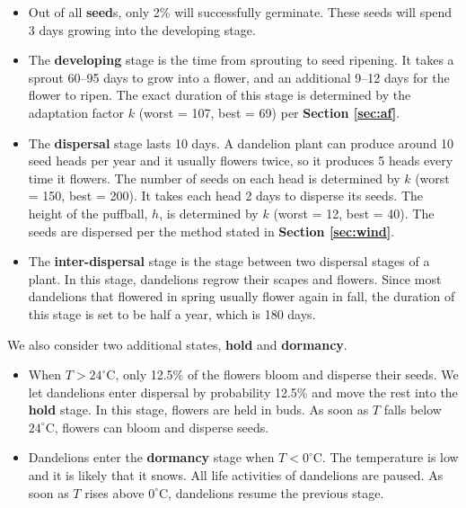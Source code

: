 \documentclass[12pt]{article}
\begin{document}
		\begin{itemize}
			
			\item Out of all \textbf{seed}s, only 2\% will successfully germinate\autocite{honek2005post}.  These seeds will spend 3 days growing into the developing stage\autocite{stewart2002biology}.
			
			\item The \textbf{developing} stage is the time from sprouting to seed ripening.  It takes a sprout 60--95 days to grow into a flower, and an additional 9--12 days for the flower to ripen\autocite{gardenorganicNAripen}.  The exact duration of this stage is determined by the adaptation factor $k$ (worst = 107, best = 69) per \textbf{Section \ref{sec:af}}.
			
			\item The \textbf{dispersal} stage lasts 10 days.  A dandelion plant can produce around 10 seed heads per year and it usually flowers twice, so it produces 5 heads every time it flowers.  The number of seeds on each head is determined by $k$ (worst = 150, best = 200)\autocite{dukeNAdandelion}.  It takes each head 2 days to disperse its seeds.  The height of the puffball, $h$, is determined by $k$ (worst = 12, best = 40)\autocite{veggiegardenNAstem}.  The seeds are dispersed per the method stated in \textbf{Section \ref{sec:wind}}.
			
			\item The \textbf{inter-dispersal} stage is the stage between two dispersal stages of a plant.  In this stage, dandelions regrow their scapes and flowers.  Since most dandelions that flowered in spring usually flower again in fall\autocite{stewart2002biology}, the duration of this stage is set to be half a year, which is 180 days.   
			
		\end{itemize}
		We also consider two additional states, \textbf{hold} and \textbf{dormancy}.		
		\begin{itemize}
			
			\item When $T > 24^\circ$C, only 12.5\% of the flowers bloom and disperse their seeds\autocite{yoshie2020effects}.  We let dandelions enter dispersal by probability 12.5\% and move the rest into the \textbf{hold} stage.  In this stage, flowers are held in buds.  As soon as $T$ falls below $24^\circ$C, flowers can bloom and disperse seeds.  
		
			\item Dandelions enter the \textbf{dormancy} stage when $T < 0^\circ$C.  The temperature is low and it is likely that it snows.  All life activities of dandelions are paused.  As soon as $T$ rises above $0^\circ$C, dandelions resume the previous stage.
		
		\end{itemize}
		
\end{document}
